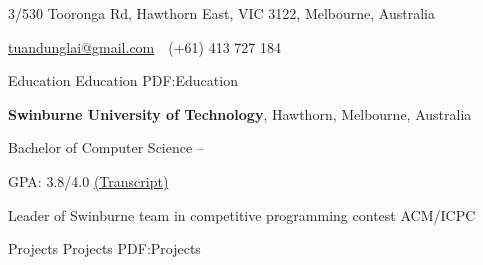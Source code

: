 \documentclass[letterpaper,MMMyyyy,nonstopmode]{simpleresumecv}
\newcommand{\CVAuthor}{Dung Lai}
\newcommand{\CVWebpage}{dunglai.github.io}
\begin{document}

\Title{\CVAuthor}

\begin{SubTitle}
{3/530 Tooronga Rd, Hawthorn East, VIC 3122, Melbourne, Australia}
\par
\href{mailto:tuandunglai@gmail.com}
{tuandunglai@gmail.com}
\,\SubBulletSymbol\,
(+61) 413 727 184
\,
\end{SubTitle}

\begin{Body}


\Section
{Education}
{Education}
{PDF:Education}

\Entry
{\textbf{Swinburne University of Technology}},
Hawthorn, Melbourne, Australia

\Gap
\BulletItem
Bachelor of Computer Science
\hfill
{} --

\SubBulletItem GPA: 3.8/4.0 
\href{https://dunglai.github.io/public/post_img/About/AcademicTranscript.pdf}{(\color{blue}Transcript)}

\SubBulletItem Leader of Swinburne team in competitive programming contest ACM/ICPC 



\Section
{Projects}
{Projects}
{PDF:Projects}


\end{Body}
\end{document}
